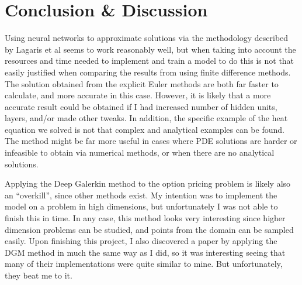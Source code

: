 \documentclass[]{article}
\begin{document}
\section{Conclusion \& Discussion}\label{conclusion-discussion}

Using neural networks to approximate solutions via the methodology
described by Lagaris et al seems to work reasonably well, but when
taking into account the resources and time needed to implement and train
a model to do this is not that easily justified when comparing the
results from using finite difference methods. The solution obtained from
the explicit Euler methods are both far faster to calculate, and more
accurate in this case. However, it is likely that a more accurate result
could be obtained if I had increased number of hidden units, layers,
and/or made other tweaks. In addition, the specific example of the heat
equation we solved is not that complex and analytical examples can be
found. The method might be far more useful in cases where PDE solutions
are harder or infeasible to obtain via numerical methods, or when there
are no analytical solutions.

Applying the Deep Galerkin method to the option pricing problem is
likely also an ``overkill'', since other methods exist. My intention was
to implement the model on a problem in high dimensions, but
unfortunately I was not able to finish this in time. In any case, this
method looks very interesting since higher dimension problems can be
studied, and points from the domain can be sampled easily. Upon
finishing this project, I also discovered a paper by
\citet{alaradi2019applications} applying the DGM method in much the same
way as I did, so it was interesting seeing that many of their
implementations were quite similar to mine. But unfortunately, they beat
me to it.

\renewcommand\refname{References}

\end{document}
